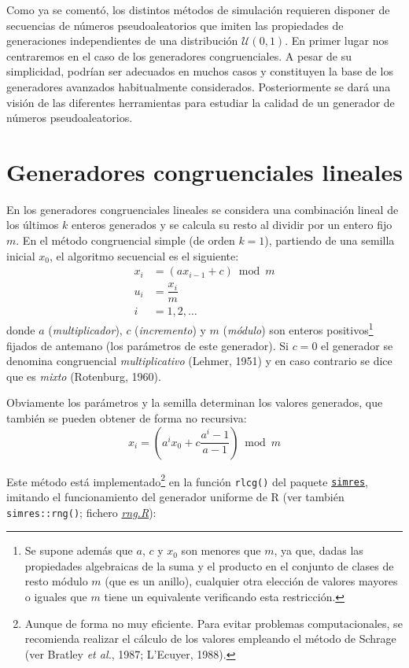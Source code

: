 \documentclass[
]{book}
\theoremstyle{break}
\theoremstyle{nonumberplain}
\begin{document}
Como ya se comentó, los distintos métodos de simulación requieren disponer de secuencias de números pseudoaleatorios que imiten las propiedades de generaciones independientes de una distribución \(\mathcal{U}(0,1)\).
En primer lugar nos centraremos en el caso de los generadores congruenciales. A pesar de su simplicidad, podrían ser adecuados en muchos casos y constituyen la base de los generadores avanzados habitualmente considerados.
Posteriormente se dará una visión de las diferentes herramientas para estudiar la calidad de un generador de números pseudoaleatorios.

\hypertarget{gen-cong}{%
\section{Generadores congruenciales lineales}\label{gen-cong}}

En los generadores congruenciales lineales se considera una combinación lineal de los últimos \(k\) enteros generados y se calcula su resto al dividir por un entero fijo \(m\).
En el método congruencial simple (de orden \(k = 1\)), partiendo de una semilla inicial \(x_0\), el algoritmo secuencial es el siguiente:
\[\begin{aligned}
x_{i}  & = (ax_{i-1}+c) \bmod m \\
u_{i}  & = \dfrac{x_{i}}{m} \\
i  & =1,2,\ldots
\end{aligned}\]
donde \(a\) (\emph{multiplicador}), \(c\) (\emph{incremento}) y \(m\) (\emph{módulo}) son enteros positivos\footnote{Se supone además que \(a\), \(c\) y \(x_0\) son menores que \(m\), ya que, dadas las propiedades algebraicas de la suma y el producto en el conjunto de clases de resto módulo \(m\) (que es un anillo), cualquier otra elección de valores mayores o iguales que \(m\) tiene un equivalente verificando esta restricción.} fijados de antemano (los parámetros de este generador). Si \(c=0\) el generador se denomina congruencial \emph{multiplicativo} (Lehmer, 1951) y en caso contrario se dice que es \emph{mixto} (Rotenburg, 1960).

Obviamente los parámetros y la semilla determinan los valores generados, que también se pueden obtener de forma no recursiva:
\[x_{i}=\left( a^{i}x_0+c\frac{a^{i}-1}{a-1}\right) \bmod m\]

Este método está implementado\footnote{Aunque de forma no muy eficiente. Para evitar problemas computacionales, se recomienda realizar el cálculo de los valores empleando el método de Schrage (ver Bratley \emph{et al.}, 1987; L'Ecuyer, 1988).} en la función \texttt{rlcg()} del paquete \href{https://rubenfcasal.github.io/simres}{\texttt{simres}}, imitando el funcionamiento del generador uniforme de R (ver también \texttt{simres::rng()}; fichero \href{R/rng.R}{\emph{rng.R}}):
\end{document}
